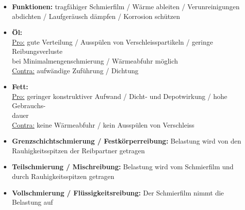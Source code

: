 \begin{scriptsize}
    \begin{itemize}
        \item \textbf{Funktionen:} tragfähiger Schmierfilm / Wärme ableiten / Verunreinigungen \\abdichten / Laufgeräusch dämpfen / Korrosion schützen
        \item \textbf{Öl:} \\\underline{Pro:} gute Verteilung / Ausspülen von Verschleisspartikeln / geringe Reibungsverluste \\bei Minimalmengenschmierung / Wärmeabfuhr möglich
        \\ \underline{Contra:} aufwändige Zuführung / Dichtung
        \item \textbf{Fett:} \\\underline{Pro:} geringer konstruktiver Aufwand / Dicht- und Depotwirkung / hohe Gebrauchs-\\dauer
        \\ \underline{Contra:} keine Wärmeabfuhr / kein Ausspülen von Verschleiss
        \item \textbf{Grenzschichtschmierung / Festkörperreibung:} Belastung wird von den \\Rauhigkeitsspitzen der Reibpartner getragen
        \item \textbf{Teilschmierung / Mischreibung:} Belastung wird vom Schmierfilm und \\durch Rauhigkeitsspitzen getragen
        \item \textbf{Vollschmierung / Flüssigkeitsreibung:} Der Schmierfilm nimmt die Belastung auf
    \end{itemize}
\end{scriptsize}